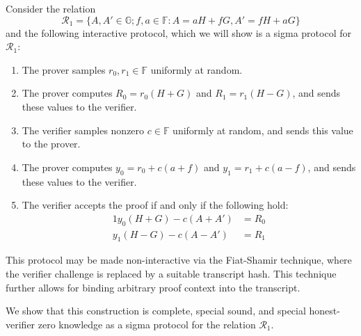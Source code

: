 \documentclass{article}
\newcommand{\G}{\mathbb{G}}
\newcommand{\F}{\mathbb{F}}
\begin{document}
Consider the relation
$$\mathcal{R}_1 = \{A,A' \in \G ; f,a \in \F : A = aH + fG, A' = fH + aG\}$$
and the following interactive protocol, which we will show is a sigma protocol for $\mathcal{R}_1$:
\begin{enumerate}
	\item The prover samples $r_0,r_1 \in \F$ uniformly at random.
	\item The prover computes $R_0 = r_0 (H + G)$ and $R_1 = r_1 (H - G)$, and sends these values to the verifier.
	\item The verifier samples nonzero $c \in \F$ uniformly at random, and sends this value to the prover.
	\item The prover computes $y_0 = r_0 + c(a + f)$ and $y_1 = r_1 + c(a - f)$, and sends these values to the verifier.
	\item The verifier accepts the proof if and only if the following hold:
		\begin{alignat}{1}
			y_0 (H + G) - c(A + A') &= R_0 \label{eqn:L1_1}\\
			y_1 (H - G) - c(A - A') &= R_1 \label{eqn:L1_2}
		\end{alignat}
\end{enumerate}
This protocol may be made non-interactive via the Fiat-Shamir technique, where the verifier challenge is replaced by a suitable transcript hash.
This technique further allows for binding arbitrary proof context into the transcript.

We show that this construction is complete, special sound, and special honest-verifier zero knowledge as a sigma protocol for the relation $\mathcal{R}_1$.
\end{document}
